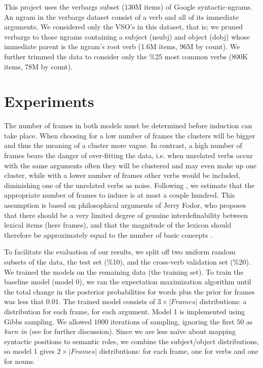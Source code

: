 \documentclass{article} %
\begin{document}
This project uses the verbargs subset (130M items) of Google syntactic-ngrams.
An ngram in the verbargs dataset consist of a verb and all of its 
immediate arguments.
We considered only the VSO's in this dataset, that is; we pruned verbargs to
those ngrams containing a subject (nsubj) and object (dobj) whose immediate parent
is the ngram's root verb (1.6M items, 96M by count). 
We further trimmed the data to consider only the \%25 most common verbs 
(800K items, 78M by count).



\section{Experiments}
The number of frames in both models must be determined before induction can take place. When choosing for a low number of frames the clusters will be bigger and thus the meaning of a cluster more vague. In contrast, a high number of frames bears the danger of over-fitting the data, i.e. when unrelated verbs occur with the same arguments often they will be clustered and may even make up one cluster, while with a lower number of frames other verbs would be included, diminishing one of the unrelated verbs as noise. Following \citet{rooth1999}, we estimate that the appropriate number of frames to induce is at most a couple hundred. This assumption is based on philosophical arguments of Jerry Fodor, who proposes that there should be a very limited degree of genuine interdefinability between lexical items (here frames), and that the magnitude of the lexicon should therefore be approximately equal to the number of basic concepts \citep{fodor1998}.

To facilitate the evaluation of our results, we split off two uniform random subsets of the data, the test set (\%10), and the cross-verb validation set (\%20). We trained the models on the remaining data (the training set). To train the baseline model (model 0), we ran the expectation maximization algorithm until the total change in the posterior probabilities for words plus the prior for frames was less that $0.01$. The trained model consists of $3\times|Frames|$ distributions: a distribution for each frame, for each argument. Model 1 is implemented using Gibbs sampling. We allowed $1000$ iterations of sampling, ignoring the first $50$ as \emph{burn in} (see \citet{raftery1992} for further discussion). Since we are less na\"ive about mapping syntactic positions to semantic roles, we combine the subject/object distributions, so model 1 gives $2\times|Frames|$ distributions: for each frame, one for verbs and one for nouns.
\end{document}

